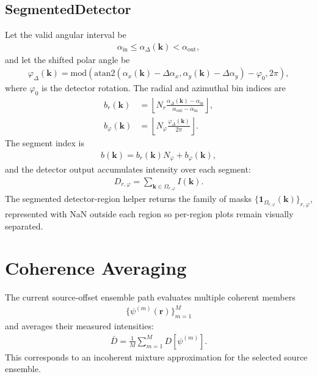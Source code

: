 \documentclass[11pt]{article}
\begin{document}
\subsection{SegmentedDetector}
Let the valid angular interval be
\begin{align}
  \alpha_{\mathrm{in}} \le \alpha_\Delta(\mathbf{k}) < \alpha_{\mathrm{out}},
\end{align}
and let the shifted polar angle be
\begin{align}
  \varphi_\Delta(\mathbf{k})
  =
  \mathrm{mod}\!\left(
    \mathrm{atan2}\!\left(
      \alpha_x(\mathbf{k})-\Delta\alpha_x,
      \alpha_y(\mathbf{k})-\Delta\alpha_y
    \right)
    - \varphi_0,
    2\pi
  \right),
\end{align}
where $\varphi_0$ is the detector rotation.  The radial and azimuthal bin indices are
\begin{align}
  b_r(\mathbf{k}) &=
  \left\lfloor
    N_r \frac{\alpha_\Delta(\mathbf{k})-\alpha_{\mathrm{in}}}
               {\alpha_{\mathrm{out}}-\alpha_{\mathrm{in}}}
  \right\rfloor, \\
  b_\varphi(\mathbf{k}) &=
  \left\lfloor
    N_\varphi \frac{\varphi_\Delta(\mathbf{k})}{2\pi}
  \right\rfloor.
\end{align}
The segment index is
\begin{align}
  b(\mathbf{k}) = b_r(\mathbf{k}) N_\varphi + b_\varphi(\mathbf{k}),
\end{align}
and the detector output accumulates intensity over each segment:
\begin{align}
  D_{r,\varphi}
  = \sum_{\mathbf{k} \in \Omega_{r,\varphi}} I(\mathbf{k}).
\end{align}
The segmented detector-region helper returns the family of masks
$\{\mathbf{1}_{\Omega_{r,\varphi}}(\mathbf{k})\}_{r,\varphi}$, represented with
NaN outside each region so per-region plots remain visually separated.

\section{Coherence Averaging}
The current source-offset ensemble path evaluates multiple coherent members
\begin{align}
  \{\psi^{(m)}(\mathbf{r})\}_{m=1}^{M}
\end{align}
and averages their measured intensities:
\begin{align}
  \bar{D}
  = \frac{1}{M}\sum_{m=1}^{M} D\!\left[\psi^{(m)}\right].
\end{align}
This corresponds to an incoherent mixture approximation for the selected source
ensemble.
\end{document}
